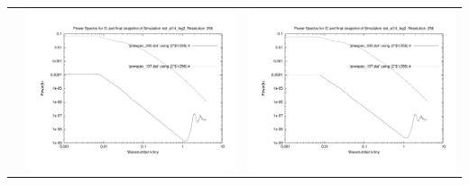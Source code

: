 \documentclass[a4paper,11pt,fleqn,oneside]{book}
\begin{document}
\begin{itemize}
\begin{table}[p]
\begin{tabular}{l|c|c}
 & \includegraphics[scale=0.25]{r256/h70/red_st14_log2/plot_powspec_red_st14_log2.pdf} & \includegraphics[scale=0.25]{r256/h100/red_st14_log2/plot_powspec_red_st14_log2.pdf} \\

\end{tabular}
\end{table}
\end{itemize}
\end{document}
